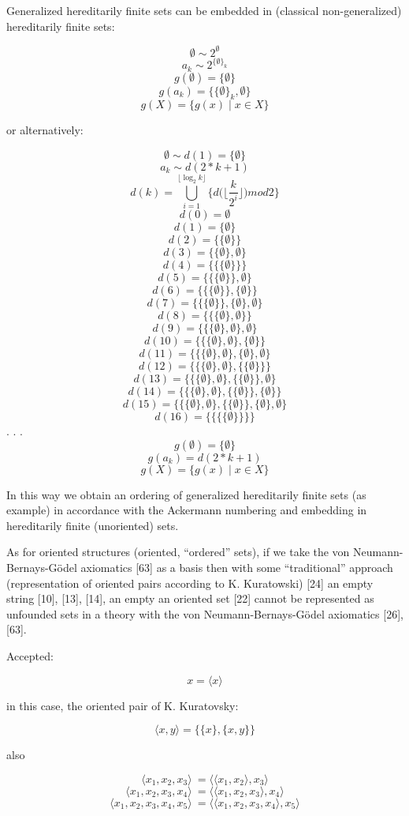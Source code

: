 \documentclass[10pt, a4paper]{article}
\begin{document}
\begin{multicols}{2}
Generalized hereditarily finite sets can be embedded
in (classical non-generalized) hereditarily finite sets:
\begin{center}
\[\emptyset\sim 2^\emptyset\]
\[a_k\sim 2^{{\{\emptyset\}}_k}\]
\[g(\emptyset) = \{\emptyset\}\]
\[g(a_k) = \{\{\emptyset\}_k, \emptyset\}\]
\[g(X) = \{g(x)\mid x\in X\}\]
\end{center}
\noindent or alternatively:
\begin{center}
\[\emptyset \sim d(1) = \{\emptyset\}\] 
\[a_k \sim d(2*k+1)\]
\[d(k) = \bigcup\limits_{i=1}^{\lfloor \log_2 k \rfloor}\Big\{d\Big(\Big\lfloor \frac{k}{2^i} \Big\rfloor \Big)mod2\Big\}\]
\[d(0) = \emptyset\]
\[d(1) = \{\emptyset\}\]
\[d(2) = \{\{\emptyset\}\}\]
\[d(3) = \{\{\emptyset\}, \emptyset\}\]
\[d(4) = \{\{\{\emptyset\}\}\}\]
\[d(5) = \{\{\{\emptyset\}\},\emptyset\}\]
\[d(6) = \{\{\{\emptyset\}\},\{\emptyset\}\}\]
\[d(7) = \{\{\{\emptyset\}\},\{\emptyset\},\emptyset\}\]
\[d(8)=\{\{\{\emptyset\}, \emptyset\}\}\]
\[d(9)=\{\{\{\emptyset\}, \emptyset\},\emptyset\}\]
\[d(10)=\{\{\{\emptyset\}, \emptyset\},\{\emptyset\}\}\]
\[d(11)=\{\{\{\emptyset\}, \emptyset\},\{\emptyset\},\emptyset\}\]
\[d(12)=\{\{\{\emptyset\}, \emptyset\},\{\{\emptyset\}\}\}\]
\[d(13)=\{\{\{\emptyset\}, \emptyset\},\{\{\emptyset\}\},\emptyset\}\]
\[d(14)=\{\{\{\emptyset\}, \emptyset\},\{\{\emptyset\}\},\{\emptyset\}\}\]
\[d(15)=\{\{\{\emptyset\}, \emptyset\},\{\{\emptyset\}\},\{\emptyset\},\emptyset\}\]
\[d(16)=\{\{\{\{\emptyset\}\}\}\}\]
. . . 
\[g(\emptyset) = \{\emptyset\}\]
\[g(a_k)=d(2*k+1)\]
\[g(X) = \{g(x)\mid x\in X\}\]
\end{center}


In this way we obtain an ordering of generalized
hereditarily finite sets (as example) in accordance with
the Ackermann numbering and embedding in hereditarily
finite (unoriented) sets.

As for oriented structures (oriented, “ordered” sets),
if we take the von Neumann-Bernays-Gödel axiomatics
[63] as a basis then with some “traditional” approach
(representation of oriented pairs according to K. Kuratowski) [24] an empty string [10], [13], [14], an empty
an oriented set [22] cannot be represented as unfounded
sets in a theory with the von Neumann-Bernays-Gödel
axiomatics [26], [63].

Accepted:

\begin{center}
\[x=\langle x \rangle\]
\end{center}
in this case, the oriented pair of K. Kuratovsky:
\begin{center}
\[\langle x, y \rangle = \{\{x\}, \{x,y\}\}\]
\end{center}
\noindent also
\begin{center}
\[\langle x_1,x_2,x_3 \rangle\ = \langle \langle x_1,x_2 \rangle ,x_3 \rangle\]
\[\langle x_1,x_2,x_3,x_4\rangle\ = \langle \langle x_1,x_2,x_3 \rangle ,x_4 \rangle\]
\[\langle x_1,x_2,x_3,x_4,x_5\rangle\ = \langle \langle x_1,x_2,x_3,x_4 \rangle ,x_5 \rangle\]
\end{center}
\end{multicols}
\end{document}
